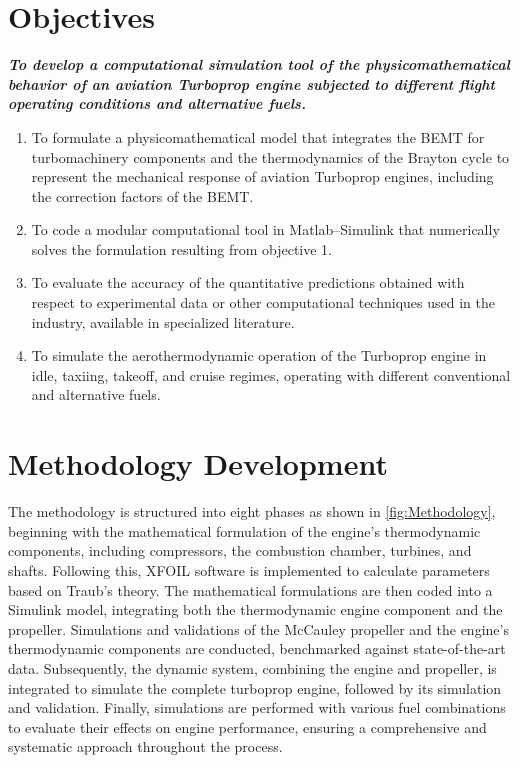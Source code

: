 \documentclass{Format}
\begin{document}
\section{Objectives}
\textit{\bfseries To develop a computational simulation tool of the physicomathematical behavior of an aviation Turboprop engine subjected to different flight operating conditions and alternative fuels.}
\begin{enumerate}[itemsep=0.1pt]
    \item To formulate a physicomathematical model that integrates the BEMT for turbomachinery components and the thermodynamics of the Brayton cycle to represent the mechanical response of aviation Turboprop engines, including the correction factors of the BEMT.
    \item To code a modular computational tool in Matlab–Simulink that numerically solves the formulation resulting from objective 1.
    \item To evaluate the accuracy of the quantitative predictions obtained with respect to experimental data or other computational techniques used in the industry, available in specialized literature.
    \item To simulate the aerothermodynamic operation of the Turboprop engine in idle, taxiing, takeoff, and cruise regimes, operating with different conventional and alternative fuels.
\end{enumerate}

\section{Methodology Development}
The methodology is structured into eight phases as shown in  \autoref{fig:Methodology}, beginning with the mathematical formulation of the engine's thermodynamic components, including compressors, the combustion chamber, turbines, and shafts. Following this, XFOIL software is implemented to calculate parameters based on Traub's theory. The mathematical formulations are then coded into a Simulink model, integrating both the thermodynamic engine component and the propeller. Simulations and validations of the McCauley propeller and the engine's thermodynamic components are conducted, benchmarked against state-of-the-art data. Subsequently, the dynamic system, combining the engine and propeller, is integrated to simulate the complete turboprop engine, followed by its simulation and validation. Finally, simulations are performed with various fuel combinations to evaluate their effects on engine performance, ensuring a comprehensive and systematic approach throughout the process.
\end{document}
